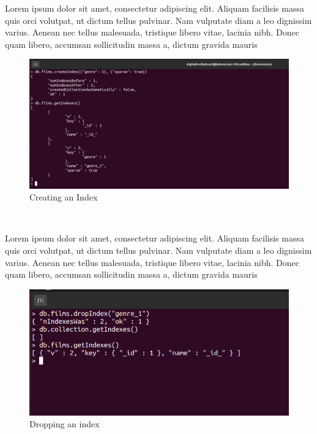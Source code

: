 \begin{spacing}{1.2}
\par Lorem ipsum dolor sit amet, consectetur adipiscing elit. Aliquam facilisis massa quis orci volutpat, ut dictum tellus pulvinar. Nam vulputate diam a leo dignissim varius. Aenean nec tellus malesuada, tristique libero vitae, lacinia nibh. Donec quam libero, accumsan sollicitudin massa a, dictum gravida mauris
\\
\begin{figure}[!htb] 
\begin{center} 
\includegraphics[width=1\linewidth]{Pictures/MongoDB/Examining MongoDB Query Features/Index management/Creating an Index} 
\end{center} 
\caption{Creating an Index} 
\end{figure}  \FloatBarrier
\\

\par Lorem ipsum dolor sit amet, consectetur adipiscing elit. Aliquam facilisis massa quis orci volutpat, ut dictum tellus pulvinar. Nam vulputate diam a leo dignissim varius. Aenean nec tellus malesuada, tristique libero vitae, lacinia nibh. Donec quam libero, accumsan sollicitudin massa a, dictum gravida mauris
\\
\begin{figure}[!htb] 
\begin{center} 
\includegraphics[width=1\linewidth]{Pictures/MongoDB/Examining MongoDB Query Features/Index management/Dropping an index} 
\end{center} 
\caption{Dropping an index} 
\end{figure}  \FloatBarrier
\\


\end{spacing}
